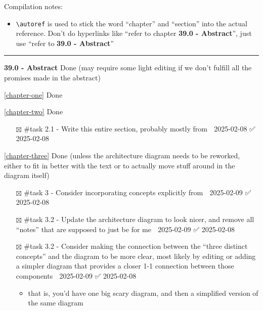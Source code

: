 Compilation notes:

\begin{itemize}
\tightlist
\item
  \passthrough{\lstinline!\\autoref!} is used to stick the word
  ``chapter'' and ``section'' into the actual reference. Don't do
  hyperlinks like ``refer to chapter \textbf{39.0 - Abstract}'', just
  use ``refer to \textbf{39.0 - Abstract}''
\end{itemize}

\begin{center}\rule{0.5\linewidth}{0.5pt}\end{center}

\textbf{39.0 - Abstract} Done (may require some light editing if we
don't fulfill all the promises made in the abstract)

\autoref{chapter-one} Done

\autoref{chapter-two} Done

\begin{itemize}
\tightlist
\item[$\boxtimes$]
  \#task 2.1 - Write this entire section, probably mostly from
  \cite{grajedaAvailabilityDatasetsDigital2017} 📅 2025-02-08 ✅
  2025-02-08
\end{itemize}

\autoref{chapter-three} Done (unless the architecture
diagram needs to be reworked, either to fit in better with the text or
to actually move stuff around in the diagram itself)

\begin{itemize}
\tightlist
\item[$\boxtimes$]
  \#task 3 - Consider incorporating concepts explicitly from
  \cite{horsmanDatasetConstructionChallenges2021} 📅 2025-02-09 ✅
  2025-02-08
\item[$\boxtimes$]
  \#task 3.2 - Update the architecture diagram to look nicer, and remove
  all ``notes'' that are supposed to just be for me 📅 2025-02-09 ✅
  2025-02-08
\item[$\boxtimes$]
  \#task 3.2 - Consider making the connection between the ``three
  distinct concepts'' and the diagram to be more clear, most likely by
  editing or adding a simpler diagram that provides a closer 1-1
  connection between those components 📅 2025-02-09 ✅ 2025-02-08

  \begin{itemize}
  \tightlist
  \item
    that is, you'd have one big scary diagram, and then a simplified
    version of the same diagram
  \end{itemize}
\end{itemize}

